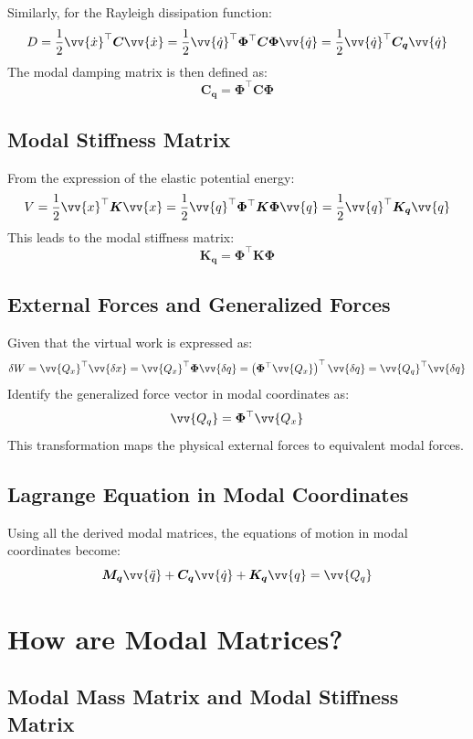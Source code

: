 Similarly, for the Rayleigh dissipation function:
\[
D = \frac{1}{2} \vv{\dot{x}}^\top \boldsymbol{C} \vv{\dot{x}} = \frac{1}{2} \vv{\dot{q}}^\top \boldsymbol{\Phi}^\top \boldsymbol{C} \boldsymbol{\Phi} \vv{\dot{q}} = \frac{1}{2} \vv{\dot{q}}^\top \boldsymbol{C_q} \vv{\dot{q}}
\]
The modal damping matrix is then defined as:
\[
\boldsymbol{C_q} = \boldsymbol{\Phi}^\top \boldsymbol{C} \boldsymbol{\Phi}
\]

\subsection{Modal Stiffness Matrix}

From the expression of the elastic potential energy:
\[
V = \frac{1}{2} \vv{x}^\top \boldsymbol{K} \vv{x} = \frac{1}{2} \vv{q}^\top \boldsymbol{\Phi}^\top \boldsymbol{K} \boldsymbol{\Phi} \vv{q} = \frac{1}{2} \vv{q}^\top \boldsymbol{K_q} \vv{q}
\]
This leads to the modal stiffness matrix:
\[
\boldsymbol{K_q} = \boldsymbol{\Phi}^\top \boldsymbol{K} \boldsymbol{\Phi}
\]

\subsection{External Forces and Generalized Forces}

Given that the virtual work is expressed as:
\[
\delta W = \vv{Q_x}^\top \vv{\delta x} = \vv{Q_x}^\top \boldsymbol{\Phi} \vv{\delta q} = \left( \boldsymbol{\Phi}^\top \vv{Q_x} \right)^\top \vv{\delta q} = \vv{Q_q}^\top \vv{\delta q}
\]
Identify the generalized force vector in modal coordinates as:
\[
\vv{Q_q} = \boldsymbol{\Phi}^\top \vv{Q_x}
\]
This transformation maps the physical external forces to equivalent modal forces.

\subsection{Lagrange Equation in Modal Coordinates}

Using all the derived modal matrices, the equations of motion in modal coordinates become:
\[
\boldsymbol{M_q} \vv{\ddot{q}} + \boldsymbol{C_q} \vv{\dot{q}} + \boldsymbol{K_q} \vv{q} = \vv{Q_q}
\]

\section{How are Modal Matrices?}

\subsection{Modal Mass Matrix and Modal Stiffness Matrix}

